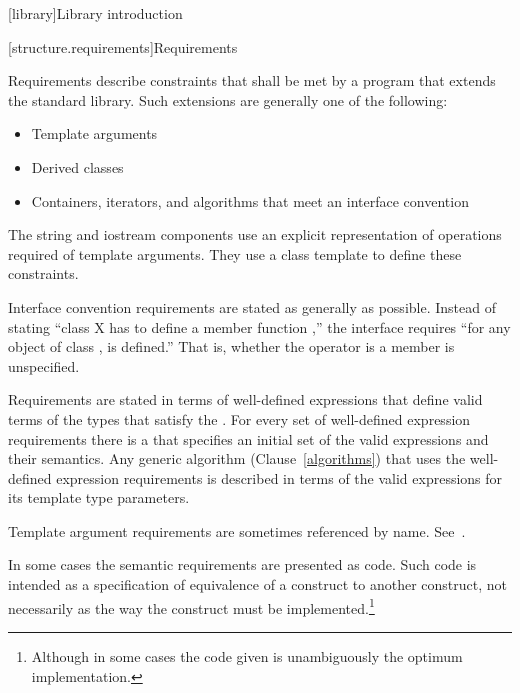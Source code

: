 \setcounter{chapter}{16}
[library]{Library introduction}

\setcounter{section}{5}
\setcounter{subsection}{1}
\setcounter{subsubsection}{2}

[structure.requirements]{Requirements}

\pnum
{}%
Requirements describe constraints that shall be met by a \Cpp program that extends the standard library.
Such extensions are generally one of the following:

\begin{itemize}
\item Template arguments
\item Derived classes
\item Containers, iterators, and algorithms that meet an interface convention
\end{itemize}

\pnum
The string and iostream components use an explicit representation of operations
required of template arguments. They use a class template  to
define these constraints.

\pnum
Interface convention requirements are stated as generally as possible. Instead
of stating ``class X has to define a member function ,'' the
interface requires ``for any object  of class ,  is
defined.'' That is, whether the operator is a member is unspecified.

\pnum
Requirements are stated in terms of  well-defined expressions that define valid terms of
the types that satisfy the . For every set of
well-defined expression requirements there is a  that
specifies an initial set of the valid expressions and their semantics. Any generic
algorithm (Clause~\ref{algorithms}) that uses the well-defined expression requirements
is described in terms of the valid expressions for its template type parameters.

\pnum
Template argument requirements are sometimes referenced by name.
See~.

\pnum
In some cases the semantic requirements are presented as \Cpp code.
Such code is intended as a
specification of equivalence of a construct to another construct, not
necessarily as the way the construct
must be implemented.\footnote{Although in some cases the code given is
unambiguously the optimum implementation.}

